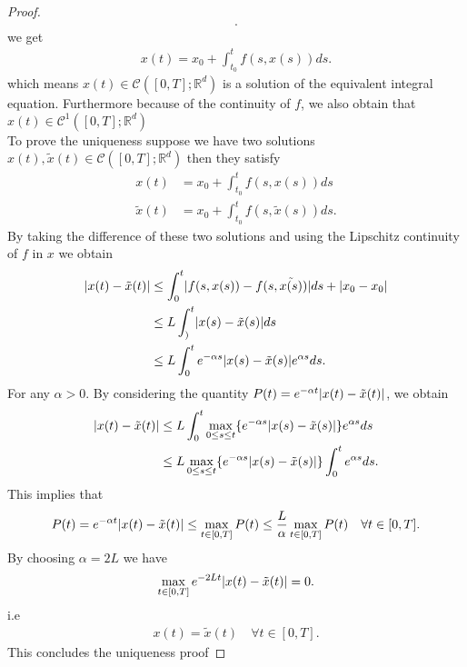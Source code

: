 \begin{proof}
\begin{align*}
 .\end{align*}
 we get 
 \begin{align*}
   x(t) = x_{0} + \int_{t_{0}}^{t} f(s,x(s)) ds
 .\end{align*}
 which means $x(t) \in  \mathcal{C}([0,T];\mathbb{R}^{d} ) $ is a solution of the equivalent integral equation. Furthermore because of the continuity of $f$, we also obtain that  $x(t) \in  \mathcal{C}^1([0,T];\mathbb{R}^{d} ) $ \\[1ex]
 To prove the uniqueness suppose we have two solutions $x(t),\tilde{x}(t) \in  \mathcal{C}([0,T];\mathbb{R}^{d} )  $ then they satisfy 
 \begin{align*}
   x(t) &= x_{0} + \int_{t_{0}}^{t} f(s,x(s))  ds \\
   \tilde{x}(t) &= x_{0} + \int_{t_{0}}^{t} f(s,\tilde{x}(s) )   ds
 .\end{align*}
 By taking the difference of these two solutions and using the Lipschitz continuity  of $f$ in $x$ we obtain 
 \begin{align*}
   \lvert x(t)- \tilde{x}(t) \rvert &\le \int_0^{t} \lvert f(s,x(s)) - f(s,\tilde{x(s)} )\rvert ds  + \lvert x_{0}-x_{0}\rvert\\
                             &\le L\int_)^{t} \lvert x(s) - \tilde{x}(s) \rvert   ds \\
                             &\le  L \int_{0}^{t} e^{-\alpha s}  \lvert x(s) - \tilde{x}(s) \rvert e^{\alpha s}  ds
 .\end{align*}
 For any $\alpha >0$. By considering the quantity $P(t) = e^{-\alpha t} \lvert x(t) - \tilde{x}(t) \rvert $, we obtain 
 \begin{align*}
   \lvert x(t) - \tilde{x}(t) \rvert &\le L \int_0^{t} \max_{0 \le s\le t}  \{e^{-\alpha  s}\lvert x(s)-\tilde{x}(s) \rvert \} e^{\alpha  s}    ds \\
                              &\le  L \max_{0\le s\le t} \{e^{-\alpha s}\lvert x(s)-\tilde{x}(s) \rvert \}   \int_0^{t} e^{\alpha s}  ds
 .\end{align*}
This implies that
 \begin{align*}
   P(t) = e^{-\alpha t} \lvert x(t)-\tilde{x}(t) \rvert \le \max_{t \in  [0,T]} P(t) \le  \frac{L}{\alpha } \max_{t \in  [0,T]} P(t) \quad \forall t \in [0,T]
 .\end{align*}
 By choosing $\alpha  = 2L$ we have 
 \begin{align*}
   \max_{t \in  [0,T]} e^{-2Lt}  \lvert x(t) - \tilde{x}(t) \rvert = 0
 .\end{align*}
 i.e 
 \begin{align*}
   x(t) = \tilde{x}(t)  \quad \forall t \in [0,T]
 .\end{align*}
This concludes the uniqueness proof
\end{proof}
